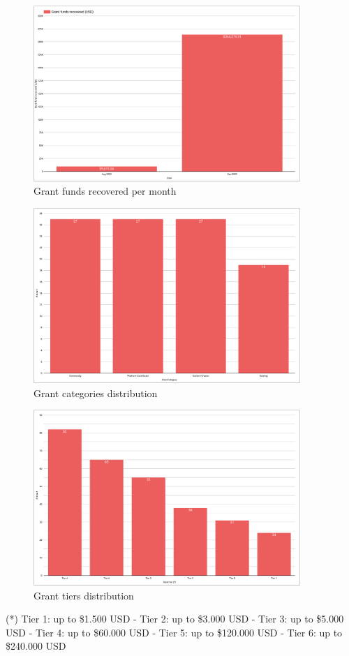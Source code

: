 \documentclass[MSE,Master,english]{twbook}%
\begin{document}
\begin{figure}[H]
  \centering
  \includegraphics[width=0.9\textwidth]{metrics/funds_recovered.png}
  \caption{Grant funds recovered per month}
  \label{fig:funds_recovered}
\end{figure}
\begin{figure}[H]
  \centering
  \includegraphics[width=0.9\textwidth]{metrics/category_distribution.png}
  \caption{Grant categories distribution}
  \label{fig:category_distribution}
\end{figure}
\begin{figure}[H]
  \centering
  \includegraphics[width=0.9\textwidth]{metrics/tier_distribution.png}
  \caption{Grant tiers distribution}
  \label{fig:tier_distribution}
\end{figure}
(*) Tier 1: up to \$1.500 USD - Tier 2: up to \$3.000 USD - Tier 3: up to \$5.000 USD - Tier 4: up to \$60.000 USD - Tier 5: up to \$120.000 USD - Tier 6: up to \$240.000 USD
\end{document}

